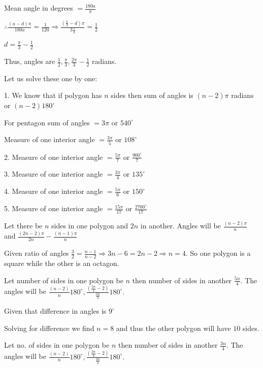     Mean angle in degrees $= \frac{180a}{\pi}$

    $\therefore \frac{(a - d)\pi}{180a} = \frac{1}{120} \Rightarrow \frac{(\frac{\pi}{3} - d)\pi}{3\frac{\pi}{3}} =
    \frac{1}{2}$

    $d = \frac{\pi}{3} - \frac{1}{2}$

    Thus, angles are $\frac{1}{2}, \frac{\pi}{3}, \frac{2\pi}{3}- \frac{1}{2}$ radians.

\item Let us solve these one by one:

    1. We know that if polygon has $n$ sides then sum of angles is $(n - 2)\pi$ radians or $(n - 2)180^\circ$

       For pentagon sum of angles $= 3\pi$ or $540^\circ$

       Measure of one interior angle $= \frac{3\pi}{5}$ or $108^\circ$

    2. Measure of one interior angle $= \frac{5\pi}{7}$ or $\frac{900^\circ}{7}$


    3. Measure of one interior angle $= \frac{3\pi}{4}$ or $135^\circ$

    4. Measure of one interior angle $= \frac{5\pi}{6}$ or $150^\circ$

    5. Measure of one interior angle $= \frac{15\pi}{17}$ or $\frac{2700^\circ}{17}$

\item Let there be $n$ sides in one polygon and $2n$ in another. Angles will be $\frac{(n - 2)\pi}{n}$ and
    $\frac{(2n - 2)\pi}{2n} - \frac{(n - 1)\pi}{n}$

    Given ratio of angles $\frac{3}{2} = \frac{n -1}{n - 2} \Rightarrow 3n - 6 = 2n -2 \Rightarrow n = 4.$ So one polygon is
    a square while the other is an octagon.

\item Let number of sides in one polygon be $n$ then number of sides in another $\frac{5n}{4}.$ The angles will be
    $\frac{(n - 2)}{n}180^\circ, \frac{(\frac{5n}{4} - 2)}{\frac{5n}{4}}180^\circ.$

    Given that difference in angles is $9^\circ$

    Solving for difference we find $n = 8$ and thus the other polygon will have $10$ sides.

\item Let no. of sides in one polygon be $n$ then number of sides in another $\frac{3n}{4}$. The angles will be
    $\frac{(n - 2)}{n}180^\circ, \frac{(\frac{3n}{4} -2)}{\frac{3n}{4}}180^\circ.$


